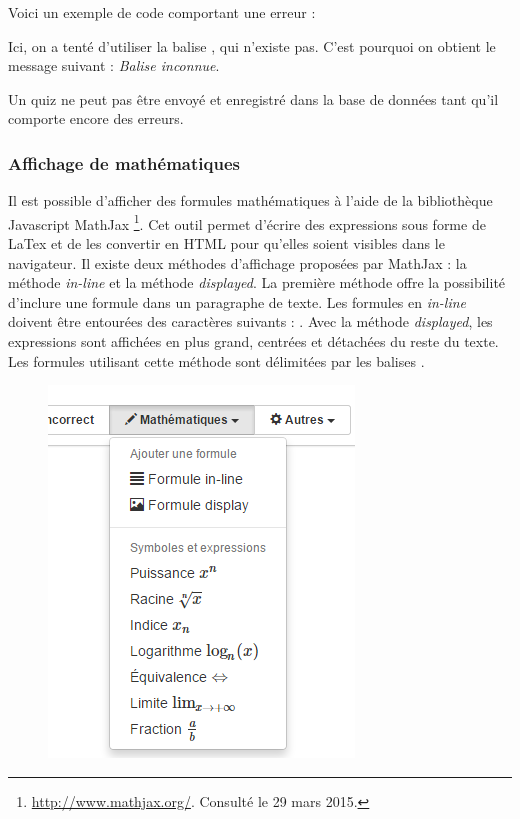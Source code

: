 \documentclass[a4,10pt,french]{sphinxmanual}
\begin{document}
Voici un exemple de code comportant une erreur :

Ici, on a tenté d'utiliser la balise \code{*=}, qui n'existe pas. C'est pourquoi on obtient le message suivant : \emph{Balise inconnue}.

Un quiz ne peut pas être envoyé et enregistré dans la base de données tant qu'il comporte encore des erreurs.


\subsubsection{Affichage de mathématiques}
\label{doc-user:affichage-de-mathematiques}
Il est possible d'afficher des formules mathématiques à l'aide de la bibliothèque Javascript MathJax \footnote{
\href{http://www.mathjax.org/}{http://www.mathjax.org/}. Consulté le 29 mars 2015.
}. Cet outil permet d'écrire des expressions sous forme de LaTex et de les convertir en HTML pour qu'elles soient visibles dans le navigateur. Il existe deux méthodes d'affichage proposées par MathJax : la méthode \emph{in-line} et la méthode \emph{displayed}. La première méthode offre la possibilité d'inclure une formule dans un paragraphe de texte. Les formules en \emph{in-line} doivent être entourées des caractères suivants : . Avec la méthode \emph{displayed}, les expressions sont affichées en plus grand, centrées et détachées du reste du texte. Les formules utilisant cette méthode sont délimitées par les balises .
\begin{figure}[htbp]
\centering

\includegraphics{math-menu.png}
\end{figure}
\end{document}
